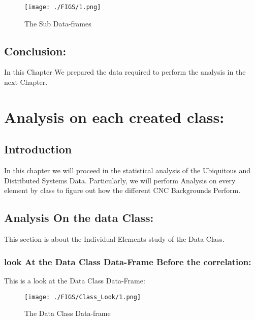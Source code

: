\documentclass[12pt]{extreport}
\begin{document}
\begin{figure}[H]
	\centering	
	\texttt{[image: ./FIGS/1.png]}
	\caption{The Sub Data-frames}
	\label{fig:300}
\end{figure}


\section{Conclusion:}
In this Chapter We prepared the data required to perform the analysis in the next Chapter.

\chapter{Analysis on each created class:}

\section{Introduction}
In this chapter we will proceed in the statistical analysis of the Ubiquitous and Distributed Systems Data. Particularly, we will perform Analysis on every element by class to figure out how the different CNC Backgrounds Perform. 

\begin{comment}
	conbut before that an interesting way to minimize the analysis is to to identify the highly correlated features in each data frame and merge them into one.tent...
\end{comment}
 
  
  
\section{Analysis On the data Class:}
This section is about the Individual Elements study of the Data Class. 

 	\subsection{look At the Data Class Data-Frame Before the correlation:}
 	
This is a look at the Data Class Data-Frame:

		\begin{figure}[H]
			\centering
			\texttt{[image: ./FIGS/Class\_Look/1.png]}
			\caption{The Data Class Data-frame}
			\label{fig:3}
		\end{figure}
\end{document}
